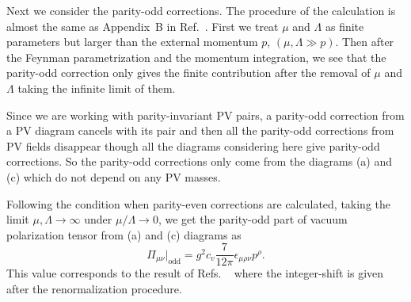 \documentclass[a4paper,12pt]{article}
\begin{document}

Next we consider the parity-odd corrections.
%
The procedure of the calculation is almost the same as
Appendix~B in Ref.~\cite{Nittoh:2000it}.
%
First we treat $\mu$ and $\Lambda$ as finite parameters
but larger than the external momentum $p$, $(\mu,\Lambda\gg p)$.
%
Then after the Feynman parametrization and the momentum integration,
we see that the parity-odd correction only gives the finite contribution
after the removal of $\mu$ and $\Lambda$
taking the infinite limit of them.


Since we are working with parity-invariant PV pairs,
a parity-odd correction from a PV diagram cancels with its pair
and then all the parity-odd corrections from PV fields
disappear
though all the diagrams considering here give parity-odd corrections.
%
So the parity-odd corrections only come from the diagrams (a) and (c)
which do not depend on any PV masses.


Following the condition when parity-even corrections are calculated,
taking the limit $\mu, \Lambda \rightarrow \infty$ under 
$\mu/\Lambda\rightarrow 0$,
we get the parity-odd part of vacuum polarization tensor
from (a) and (c) diagrams as
%
\begin{equation}
\Pi_{\mu\nu}\big|_\mathrm{odd}=
g^2c_v\frac{7}{12\pi}\epsilon_{\mu\rho\nu}p^\rho.
\label{eq:pi-odd mu << Lambda}
\end{equation}
%
This value corresponds to the result of Refs.%
~\cite{Giavarini:1992xz,Giavarini:1993xb}
where the integer-shift is given
after the renormalization procedure.
\end{document}
